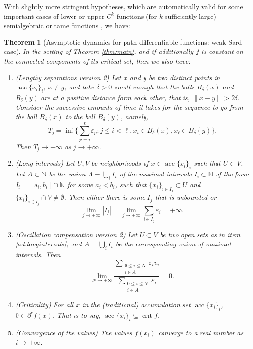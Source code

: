 \documentclass[11pt]{article}
\newtheorem{thm}{Theorem}
\theoremstyle{definition}
\theoremstyle{remark}
\DeclareMathOperator{\crit}{crit}
\DeclareMathOperator{\acc}{acc}
\newcommand{\N}{\mathbb{N}}
\renewcommand{\leq}{\leqslant}
\begin{document}
With slightly more stringent hypotheses, which are automatically valid for some important cases of lower or upper-$C^k$ functions \cite{barbet2016sard} (for $k$ sufficiently large), semialgebraic or tame functions \cite{Bolte2007}, we have:
%
\begin{thm}[Asymptotic dynamics for path differentiable functions: weak Sard case] \label{thm:addendum}
 In the setting of Theorem \ref{thm:main}, and if additionally $f$ is constant on the connected components of its critical set, then we also have:
  \begin{enumerate}[label=\roman*.,ref=(\roman*)]
  \item\label{ad:longseparation} (Lengthy separations version 2)  Let $x$ and $y$ be two distinct points in $\acc\{x_i\}_i$, $x\neq y$, and take $\delta>0$ small enough that the balls $B_\delta(x)$ and $B_\delta(y)$ are at a positive distance form each other, that is, $\|x-y\|>2\delta$. Consider the successive amounts of time it takes for the sequence to go from the ball $B_\delta(x)$ to the ball $B_\delta(y)$, namely,
  \[T_j=\inf\{\textstyle\sum_{p=i}^\ell\varepsilon_p:j\leq i<\ell,x_i\in B_\delta(x), x_\ell\in B_\delta(y)\}.\]
  Then $T_j\to+\infty$ as $j\to+\infty$.  
  \item\label{ad:longintervals} (Long intervals) Let $U,V$ be neighborhoods of $\bar{x} \in \acc\{x_i\}_i$ such that $\overline{U} \subset V$. Let $A\subset\N$ be the union $A=\bigcup_iI_i$ of the maximal intervals $I_i\subset\N$ of the form $I_i=[a_i,b_i]\cap \N$ for some $a_i<b_i$, such that $\{x_i\}_{i\in I_j}\subset U$ and $\{x_i\}_{i\in I_j}\cap V\neq\emptyset$. Then either there is some $I_j$ that is unbounded or
\[\lim_{j\to+\infty} |I_j| = \lim_{j\to+\infty}\sum_{i\in I_j}\varepsilon_i=+\infty.\]
  \item\label{ad:oscillationcomp} (Oscillation compensation version 2)   
  Let $U\subset V$ be two open sets as in item \ref{ad:longintervals}, and $A=\bigcup_iI_i$ be the corresponding union of maximal intervals. Then
     \[\lim_{N\to+\infty}\frac{\displaystyle\sum_{\substack{0\leq i\leq N\\i\in A}}\varepsilon_iv_i}{\displaystyle\sum_{\substack{0\leq i\leq N\\i\in A}}\varepsilon_i}=0. \]
  \item\label{ad:criticality} (Criticality) For all $x$ in the (traditional) accumulation set $\acc\{x_i\}_i$, $0\in\partial^cf(x)$. That is to say, $\acc\{x_i\}_i\subseteq\crit f$.
  \item\label{ad:convergencef} (Convergence of the values) The values $f(x_i)$ converge to a real number as $i\to +\infty$.
 \end{enumerate}
\end{thm}
%
\end{document}

